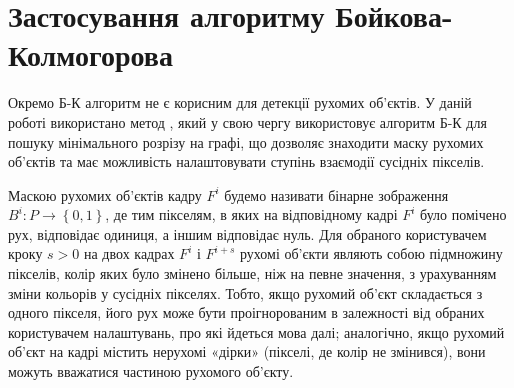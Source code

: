 \section{Застосування алгоритму Бойкова-Колмогорова}

Окремо Б-К алгоритм не є корисним для детекції рухомих об'єктів. У даній роботі 
використано метод \cite{pavliuk_krygin}, який у свою чергу використовує алгоритм Б-К 
для пошуку мінімального розрізу на графі, що дозволяє знаходити
маску рухомих об'єктів та має можливість налаштовувати ступінь взаємодії сусідніх
пікселів.

Маскою рухомих об'єктів кадру \(F^{i}\) будемо називати бінарне
зображення \(B^{i}:P \rightarrow \left\{ 0,1 \right\}\), де тим
пікселям, в яких на відповідному кадрі \(F^{i}\) було помічено рух,
відповідає одиниця, а іншим відповідає нуль. Для обраного користувачем
кроку \(s > 0\) на двох кадрах \(F^{i}\) і \(F^{i + s}\) рухомі об'єкти
являють собою підмножину пікселів, колір яких було змінено більше, ніж
на певне значення, з урахуванням зміни кольорів у сусідніх пікселях.
Тобто, якщо рухомий об'єкт складається з одного пікселя, його рух може
бути проігнорованим в залежності від обраних користувачем налаштувань,
про які йдеться мова далі; аналогічно, якщо рухомий об'єкт на кадрі
містить нерухомі «дірки» (пікселі, де колір не змінився), вони можуть
вважатися частиною рухомого об'єкту.

